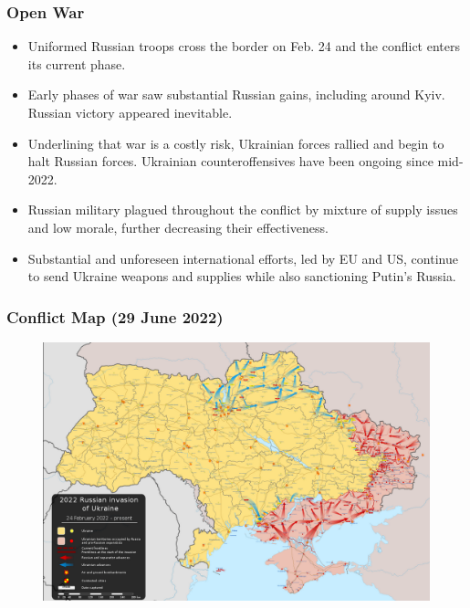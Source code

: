 \documentclass[handout]{beamer}
\begin{document}
\begin{frame} 
	\frametitle{\LARGE{Open War}}
	\begin{itemize}
		\item Uniformed Russian troops cross the border on Feb. 24 and the conflict enters its current phase. \pause
		\item Early phases of war saw substantial Russian gains, including around Kyiv. Russian victory appeared inevitable. \pause
		\item Underlining that war is a costly risk, Ukrainian forces rallied and begin to halt Russian forces. Ukrainian counteroffensives have been ongoing since mid-2022. \pause
		\item Russian military plagued throughout the conflict by mixture of supply issues and low morale, further decreasing their effectiveness. \pause
		\item Substantial and unforeseen international efforts, led by EU and US, continue to send Ukraine weapons and supplies while also sanctioning Putin's Russia. 
	\end{itemize}
\end{frame}

\begin{frame} 
	\frametitle{\LARGE{Conflict Map (29 June 2022)}}
	\begin{figure}[ht!]
		\centering
		\includegraphics[width=\textwidth,height=\textheight, keepaspectratio]{29june2022ukraine.png}
	\end{figure}
\end{frame}
\end{document}
